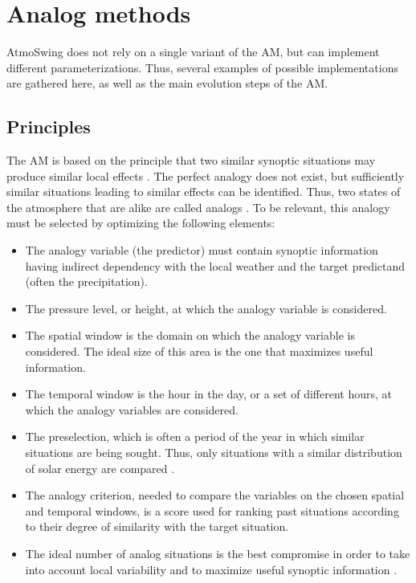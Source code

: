 \documentclass[review]{elsarticle}
\begin{document}
\section{Analog methods}
\label{sec:method}

AtmoSwing does not rely on a single variant of the AM, but can implement different parameterizations. Thus, several examples of possible implementations are gathered here, as well as the main evolution steps of the AM.

\subsection{Principles}

The AM is based on the principle that two similar synoptic situations may produce similar local effects \citep{Lorenz1956}. The perfect analogy does not exist, but sufficiently similar situations leading to similar effects can be identified. Thus, two states of the atmosphere that are alike are called analogs \citep{Lorenz1969}. To be relevant, this analogy must be selected by optimizing the following elements:

\begin{itemize}
	\item The analogy variable (the predictor) must contain synoptic information having indirect dependency with the local weather and the target predictand (often the precipitation).
	\item The pressure level, or height, at which the analogy variable is considered.
	\item The spatial window is the domain on which the analogy variable is considered. The ideal size of this area is the one that maximizes useful information.
	\item The temporal window is the hour in the day, or a set of different hours, at which the analogy variables are considered.
	\item The preselection, which is often a period of the year in which similar situations are being sought. Thus, only situations with a similar distribution of solar energy are compared \citep{Lorenz1969}.
	\item The analogy criterion, needed to compare the variables on the chosen spatial and temporal windows, is a score used for ranking past situations according to their degree of similarity with the target situation.
	\item The ideal number of analog situations is the best compromise in order to take into account local variability and to maximize useful synoptic information \citep{Bontron2004}.
\end{itemize}
\end{document}
